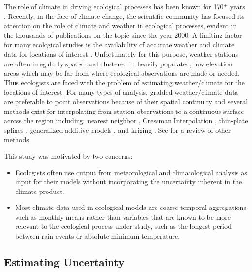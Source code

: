 \documentclass[12pt]{article}
\begin{document}
The role of climate in driving ecological processes has been known for
170$^+$ years \citep[\textit{e.g.}][]{meyen_outlines_1846}. 
Recently, in the face of climate change, the scientific
community has focused its attention on the role of climate and weather
in ecological processes, evident in the thousands of publications on
the topic since the year 2000.   A limiting factor for many ecological
studies is the availability of accurate weather and climate data for locations of interest \citep{hijmans_very_2005}.
Unfortunately for this purpose, weather stations are often irregularly spaced and
clustered in heavily populated, low elevation areas which may be far from where
ecological observations are made or needed. 
Thus ecologists are faced with the problem of estimating  weather/climate for the locations of interest.
For many types of analysis, gridded weather/climate data are
preferable to point observations because of their spatial continuity
\citep{haylock_european_2008} and several methods exist for interpolating from station observations to a
continuous surface across the region including: nearest neighbor
\citep{stahl_comparison_2006}, Cressman Interpolation
\citep{cressman_operational_1959}, thin-plate splines
\citep{tait_thin_2006}, generalized additive models
\citep{guan_modeling_2009}, and kriging
\citep{haylock_european_2008}. See \citealp{apaydin_spatial_2004} for a
review of other methods.

This study was motivated by two concerns:
\begin{itemize}
\item Ecologists often use output from meteorological and climatological analysis as input for  their models without
  incorporating the uncertainty inherent in the climate product.  
\item Most climate data used in ecological models are coarse temporal
  aggregations such as monthly means rather than variables that are
  known to be more relevant to the ecological process under study,
  such as the longest period between rain events or absolute minimum temperature.
\end{itemize}

\subsection{Estimating Uncertainty}
\end{document}

